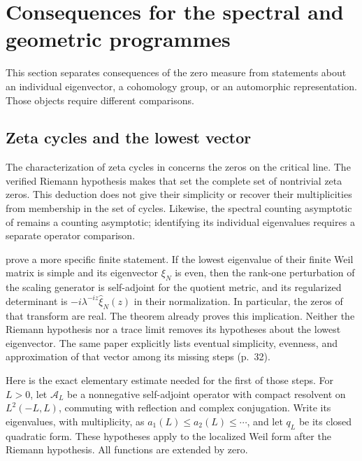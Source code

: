 \section{Consequences for the spectral and geometric programmes}
This section separates consequences of the zero measure from statements
about an individual eigenvector, a cohomology group, or an automorphic
representation. Those objects require different comparisons.

\subsection{Zeta cycles and the lowest vector}
The characterization of zeta cycles in
\citet[Theorem~1.1, p.~4, and Theorem~6.4, pp.~52--53]{cc2021}
concerns the zeros on the critical line. The verified Riemann hypothesis
makes that set the complete set of nontrivial zeta zeros. This deduction
does not give their simplicity or recover their multiplicities from
membership in the set of cycles. Likewise, the spectral counting
asymptotic of \citet[Theorem~6.1, p.~13]{cm2021} remains a counting
asymptotic; identifying its individual eigenvalues requires a separate
operator comparison.

\citet[Theorem~5.10, p.~23]{ccm2025} prove a more specific finite
statement. If the lowest eigenvalue of their finite Weil matrix is
simple and its eigenvector $\xi_N$ is even, then the rank-one
perturbation of the scaling generator is self-adjoint for the
quotient metric, and its regularized determinant is
$-i\lambda^{-iz}\widehat\xi_N(z)$ in their normalization. In
particular, the zeros of that transform are real. The theorem already
proves this implication. Neither the Riemann hypothesis nor a trace
limit removes its hypotheses about the lowest eigenvector. The same
paper explicitly lists eventual simplicity, evenness, and approximation
of that vector among its missing steps (p.~32).

Here is the exact elementary estimate needed for the first of those
steps. For $L>0$, let $\mathcal A_L$ be a nonnegative self-adjoint
operator with compact resolvent on $L^2(-L,L)$, commuting with
reflection and complex conjugation. Write its eigenvalues, with
multiplicity, as $a_1(L)\leq a_2(L)\leq\cdots$, and let $q_L$ be its
closed quadratic form. These hypotheses apply to the localized Weil
form after the Riemann hypothesis. All functions are extended by zero.

